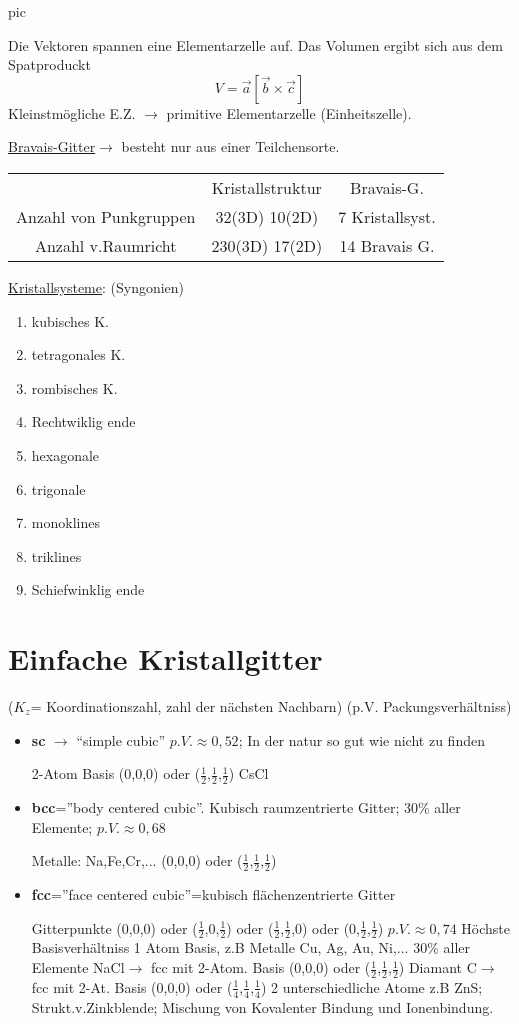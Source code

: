 pic

Die Vektoren spannen eine Elementarzelle auf. Das Volumen ergibt sich aus dem Spatproduckt
\[ V=\vec a [\vec b \times \vec c] \]
Kleinstmögliche E.Z. \(\rightarrow\) primitive Elementarzelle (Einheitszelle).

\underline{Bravais-Gitter}\(\rightarrow\) besteht nur aus einer Teilchensorte.

\begin{tabular}{ccc}
&Kristallstruktur&Bravais-G.\\
Anzahl von Punkgruppen& 32(3D) 10(2D)& 7 Kristallsyst.\\
Anzahl v.Raumricht&230(3D) 17(2D)&14 Bravais G.
\end{tabular}

\underline{Kristallsysteme}: (Syngonien)
\begin{enumerate}
\item kubisches K.
\item tetragonales K.
\item rombisches K.
\item Rechtwiklig ende
\item hexagonale
\item trigonale
\item monoklines
\item triklines
\item Schiefwinklig ende
\end{enumerate}



\section{Einfache Kristallgitter} 
(\(K_z\)= Koordinationszahl, zahl der nächsten Nachbarn)
(p.V. Packungsverhältniss)

\begin{itemize}
\item \textbf{sc} \(\rightarrow\) ``simple cubic'' \(p.V.\approx 0,52\); In der natur so gut
  wie nicht zu finden

2-Atom Basis (0,0,0) oder (\(\frac 1 2\),\(\frac 1 2\),\(\frac 1 2\))
CsCl

\item \textbf{bcc}=''body centered cubic''. Kubisch raumzentrierte Gitter; 30\%
  aller Elemente; \(p.V.\approx 0,68\)

Metalle: Na,Fe,Cr,...
 (0,0,0) oder (\(\frac 1 2\),\(\frac 1 2\),\(\frac 1 2\))
\item \textbf{fcc}=''face centered cubic''=kubisch flächenzentrierte Gitter

Gitterpunkte
 (0,0,0) oder (\(\frac 1 2\),\(0\),\(\frac 1 2\)) oder (\(\frac 1 2\),\(\frac 1 2\),0)
 oder (0,\(\frac 1 2\),\(\frac 1 2\))  \(p.V.\approx 0,74\) Höchste Basisverhältniss
1 Atom Basis, z.B Metalle Cu, Ag, Au, Ni,... 30\% aller Elemente
NaCl\(\rightarrow\) fcc mit 2-Atom. Basis (0,0,0) oder (\(\frac 1 2\),\(\frac 1
2\),\(\frac 1 2\))
Diamant C\(\rightarrow\)fcc mit 2-At. Basis (0,0,0) oder (\(\frac 1 4\),\(\frac 1
4\),\(\frac 1 4\))
2 unterschiedliche Atome z.B ZnS; Strukt.v.Zinkblende; Mischung von Kovalenter
Bindung und Ionenbindung.
\end{itemize}



